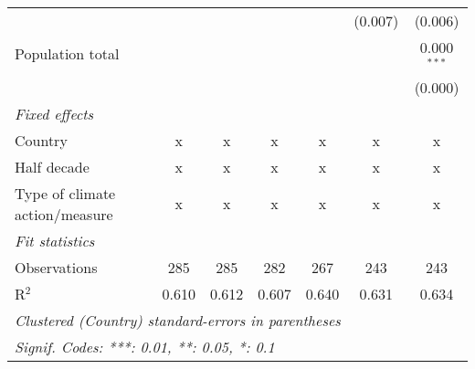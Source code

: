 \begin{tabular}{lcccccc}
                                                           &         &         &         &         & (0.007) & (0.006)\\   
   Population total                                        &         &         &         &         &         & 0.000$^{***}$\\   
                                                           &         &         &         &         &         & (0.000)\\   
   \emph{Fixed effects}\\
   Country                                                 & x       & x       & x       & x       & x       & x\\  
   Half decade                                             & x       & x       & x       & x       & x       & x\\  
   Type of climate action/measure                          & x       & x       & x       & x       & x       & x\\  
   \midrule \emph{Fit statistics}\\
   Observations                                            & 285     & 285     & 282     & 267     & 243     & 243\\  
   R$^2$                                                   & 0.610   & 0.612   & 0.607   & 0.640   & 0.631   & 0.634\\  
   \midrule
   \multicolumn{7}{l}{\emph{Clustered (Country) standard-errors in parentheses}}\\
   \multicolumn{7}{l}{\emph{Signif. Codes: ***: 0.01, **: 0.05, *: 0.1}}\\
\end{tabular}
\par\endgroup


